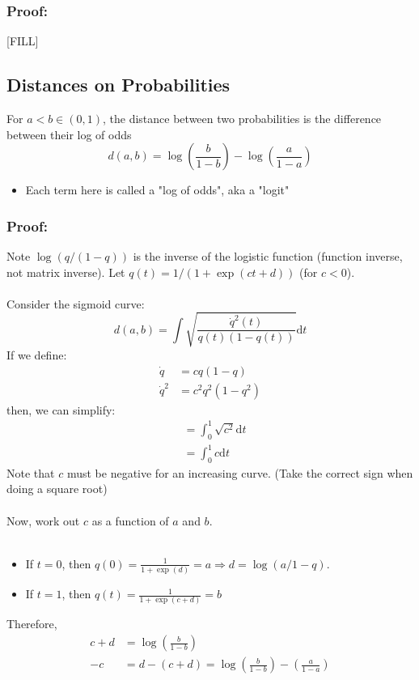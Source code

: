 \documentclass[10pt]{article}
\newcommand{\dd}{\text{d}}
\begin{document}
\subsubsection*{Proof:}
[FILL]

\subsection*{Distances on Probabilities}
For $a < b \in (0, 1)$, the distance between two probabilities is the difference between their log of odds
\[d(a, b) = \log\left(\frac{b}{1 - b}\right) - \log\left(\frac{a}{1 - a}\right)\]
\begin{itemize}
	\item Each term here is called a "log of odds", aka a "logit"
\end{itemize}

\subsubsection*{Proof:}
Note $\log(q / (1 - q))$ is the inverse of the logistic function (function inverse, not matrix inverse).  Let $q(t) = 1 / (1 + \exp(ct + d))$ (for $c < 0$).\\\\
Consider the sigmoid curve:
\[d(a, b) = \int \sqrt{\frac{\dot{q}^2(t)}{q(t) (1 - q(t))}}\dd t\]
If we define:
\begin{align*}
    \dot{q} &= cq(1 - q)\\
    \dot{q}^2 &= c^2 q^2 (1 - q^2)
\end{align*}
then, we can simplify:
\begin{align*}
    &= \int_0^1 \sqrt{c^2} \dd t\\
    &= \int_0^1 c \dd t
\end{align*}
Note that $c$ must be negative for an increasing curve.  (Take the correct sign when doing a square root)\\\\
Now, work out $c$ as a function of $a$ and $b$.\\\\
\begin{itemize}
	\item If $t = 0$, then $q(0) = \frac{1}{1 + \exp(d)} = a \Rightarrow d = \log(a / 1 - q)$.
	\item If $t = 1$, then $q(t) = \frac{1}{1 + \exp(c + d)} = b$
\end{itemize}
Therefore,
\begin{align*}
    c + d &= \log\left(\frac{b}{1 - b}\right)\\
    -c &= d - (c + d) = \log\left(\frac{b}{1 - b}\right) - \left(\frac{a}{1 - a}\right)
\end{align*}
\end{document}
